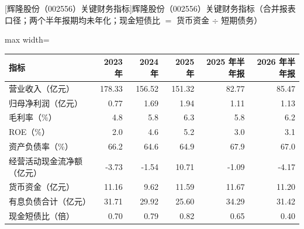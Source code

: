 \begin{center}\small\setlength{\tabcolsep}{3.4pt}
[辉隆股份（002556）关键财务指标]{辉隆股份（002556）关键财务指标（合并报表口径；两个半年报期均未年化；现金短债比 $=$ 货币资金 $\div$ 短期债务）}
\begin{adjustbox}{max width=\textwidth}
\begin{tabular}{@{}lrrrrr@{}}
\toprule
指标 & 2023 年 & 2024 年 & 2025 年 & 2025 年半年报 & 2026 年半年报 \\
\midrule
营业收入（亿元） & 178.33 & 156.52 & 151.32 & 82.77 & 85.47 \\
归母净利润（亿元） & 0.77 & 1.69 & 1.94 & 1.11 & 1.13 \\
毛利率（\%） & 4.8 & 5.8 & 6.3 & 5.8 & 6.2 \\
ROE（\%） & 2.0 & 4.6 & 5.2 & 3.0 & 3.1 \\
资产负债率（\%） & 66.2 & 64.6 & 64.9 & 67.9 & 67.0 \\
经营活动现金流净额（亿元） & -3.73 & -1.54 & 10.71 & -1.09 & -4.17 \\
货币资金（亿元） & 11.16 & 9.62 & 11.59 & 11.67 & 11.20 \\
有息负债合计（亿元） & 31.71 & 29.92 & 25.60 & 34.29 & 31.42 \\
现金短债比（倍） & 0.70 & 0.79 & 0.82 & 0.65 & 0.40 \\
\bottomrule
\end{tabular}
\end{adjustbox}
\end{center}


